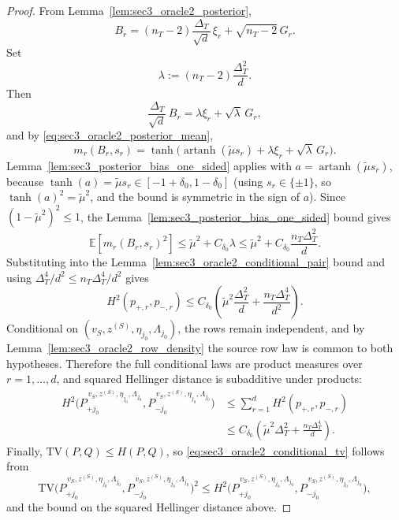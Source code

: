 \documentclass[10pt]{article}
\newcommand{\Ebb}{\mathbb E}
\newcommand{\TV}{\mathrm{TV}}
\newcommand{\trg}{T}
\newcommand{\nT}{n_{\trg}}
\newcommand{\DeltaT}{\Delta_{\trg}}
\newcommand{\src}{S}
\newcommand{\zsrc}{z^{(\src)}}
\begin{document}
\begin{proof}
From Lemma~\ref{lem:sec3_oracle2_posterior},
\[
    B_r
    =
    (\nT-2)\frac{\DeltaT}{\sqrt d}\,\xi_r+\sqrt{\nT-2}\,G_r.
\]
Set
\[
    \lambda:=(\nT-2)\frac{\DeltaT^2}{d}.
\]
Then
\[
    \frac{\DeltaT}{\sqrt d}\, B_r
    =
    \lambda\xi_r+\sqrt{\lambda}\,G_r,
\]
and by \eqref{eq:sec3_oracle2_posterior_mean},
\[
    m_r(B_r,s_r)
    =
    \tanh\!\bigl(
        \operatorname{artanh}(\tilde\mu s_r)
        +
        \lambda\xi_r
        +
        \sqrt{\lambda}\,G_r
    \bigr).
\]
Lemma~\ref{lem:sec3_posterior_bias_one_sided} applies with
$a=\operatorname{artanh}(\tilde\mu s_r)$, because $\tanh(a)=\tilde\mu s_r\in[-1+\delta_0,1-\delta_0]$
(using $s_r\in\{\pm1\}$, so $\tanh(a)^2=\tilde\mu^2$, and the bound is symmetric
in the sign of $a$). Since $(1-\tilde\mu^2)^2\le 1$, the Lemma~\ref{lem:sec3_posterior_bias_one_sided}
bound gives
\[
    \Ebb[m_r(B_r,s_r)^2]
    \le
    \tilde\mu^2 + C_{\delta_0}\lambda
    \le
    \tilde\mu^2 + C_{\delta_0}\frac{\nT\DeltaT^2}{d}.
\]
Substituting into the Lemma~\ref{lem:sec3_oracle2_conditional_pair} bound and
using $\DeltaT^4/d^2\le\nT\DeltaT^4/d^2$ gives
\begin{equation}
\label{eq:sec3_oracle2_row_hellinger}
    H^2(p_{+,r},p_{-,r})
    \le
    C_{\delta_0}\left(
        \tilde\mu^2\frac{\DeltaT^2}{d}
        +
        \frac{\nT\DeltaT^4}{d^2}
    \right).
\end{equation}
Conditional on $(v_{\src},\zsrc,\eta_{j_0},\Lambda_{j_0})$, the rows remain
independent, and by Lemma~\ref{lem:sec3_oracle2_row_density} the source row law
is common to both hypotheses. Therefore the full conditional laws are product
measures over $r=1,\ldots,d$, and squared Hellinger distance is subadditive
under products:
\begin{align*}
    H^2\!\bigl(
        P_{+j_0}^{\,v_{\src},\zsrc,\eta_{j_0},\Lambda_{j_0}},
        P_{-j_0}^{\,v_{\src},\zsrc,\eta_{j_0},\Lambda_{j_0}}
    \bigr)
    &\le
    \sum_{r=1}^d H^2(p_{+,r},p_{-,r})\\
    &\le
    C_{\delta_0}\left(
        \tilde\mu^2\DeltaT^2
        +
        \frac{\nT\DeltaT^4}{d}
    \right).
\end{align*}
Finally, $\TV(P,Q)\le H(P,Q)$, so
\eqref{eq:sec3_oracle2_conditional_tv} follows from
\[
    \TV\!\bigl(
        P_{+j_0}^{\,v_{\src},\zsrc,\eta_{j_0},\Lambda_{j_0}},
        P_{-j_0}^{\,v_{\src},\zsrc,\eta_{j_0},\Lambda_{j_0}}
    \bigr)^2
    \le
    H^2\!\bigl(
        P_{+j_0}^{\,v_{\src},\zsrc,\eta_{j_0},\Lambda_{j_0}},
        P_{-j_0}^{\,v_{\src},\zsrc,\eta_{j_0},\Lambda_{j_0}}
    \bigr),
\]
and the bound on the squared Hellinger distance above.
\end{proof}
\end{document}
